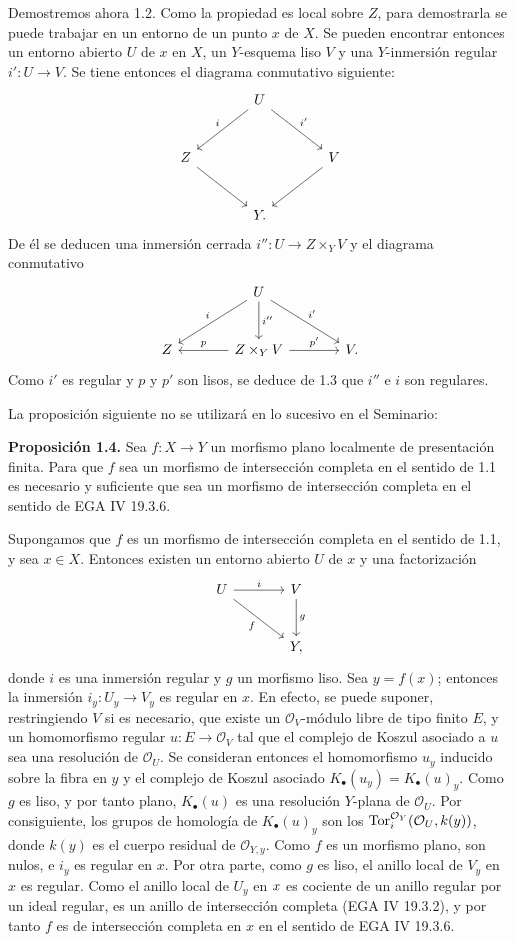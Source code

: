Demostremos ahora 1.2. Como la propiedad es local sobre $Z$, para demostrarla
se puede trabajar en un entorno de un punto $x$ de $X$. Se pueden encontrar
entonces un entorno abierto $U$ de $x$ en $X$, un $Y$-esquema liso $V$ y una
$Y$-inmersión regular $i':U\to V$. Se tiene entonces el diagrama conmutativo
siguiente:
\[
\begin{tikzcd}[column sep=large,row sep=large]
& U \arrow[dl,"i"'] \arrow[dr,"i'"] &\\
Z \arrow[dr] && V \arrow[dl]\\
& Y . &
\end{tikzcd}
\]
De él se deducen una inmersión cerrada $i'':U\to Z\times_Y V$ y el diagrama
conmutativo
\[
\begin{tikzcd}[column sep=large,row sep=large]
& U \arrow[dl,"i"'] \arrow[d,"i''"] \arrow[dr,"i'"] &\\
Z & Z\times_Y V \arrow[l,"p"'] \arrow[r,"p'"] & V.
\end{tikzcd}
\]
Como $i'$ es regular y $p$ y $p'$ son lisos, se deduce de 1.3 que $i''$ e $i$
son regulares.

La proposición siguiente no se utilizará en lo sucesivo en el Seminario:

\textbf{Proposición 1.4.} Sea $f:X\to Y$ un morfismo plano localmente de
presentación finita. Para que $f$ sea un morfismo de intersección completa en
el sentido de 1.1 es necesario y suficiente que sea un morfismo de
intersección completa en el sentido de EGA IV 19.3.6.

Supongamos que $f$ es un morfismo de intersección completa en el sentido de
1.1, y sea $x\in X$. Entonces existen un entorno abierto $U$ de $x$ y una
factorización
\[
\begin{tikzcd}[column sep=large,row sep=large]
U \arrow[r,"i"] \arrow[dr,"f"'] & V \arrow[d,"g"]\\
& Y,
\end{tikzcd}
\]
donde $i$ es una inmersión regular y $g$ un morfismo liso. Sea $y=f(x)$;
entonces la inmersión $i_y:U_y\to V_y$ es regular en $x$. En efecto, se
puede suponer, restringiendo $V$ si es necesario, que existe un
$\mathcal O_V$-módulo libre de tipo finito $E$, y un homomorfismo regular
$u:E\to\mathcal O_V$ tal que el complejo de Koszul asociado a $u$ sea una
resolución de $\mathcal O_U$. Se consideran entonces el homomorfismo $u_y$
inducido sobre la fibra en $y$ y el complejo de Koszul asociado
$K_\bullet(u_y)=K_\bullet(u)_y$. Como $g$ es liso, y por tanto plano,
$K_\bullet(u)$ es una resolución $Y$-plana de $\mathcal O_U$. Por consiguiente,
los grupos de homología de $K_\bullet(u)_y$ son los
$\Tor_i^{\mathcal O_Y}(\mathcal O_U,k(y))$, donde $k(y)$ es el cuerpo residual
de $\mathcal O_{Y,y}$. Como $f$ es un morfismo plano, son nulos, e $i_y$ es
regular en $x$. Por otra parte, como $g$ es liso, el anillo local de $V_y$ en
$x$ es regular. Como el anillo local de $U_y$ en $\sisi{y}{x}$ es cociente de un anillo %
regular por un ideal regular, es un anillo de intersección completa (EGA IV
19.3.2), y por tanto $f$ es de intersección completa en $x$ en el sentido de
EGA IV 19.3.6.

